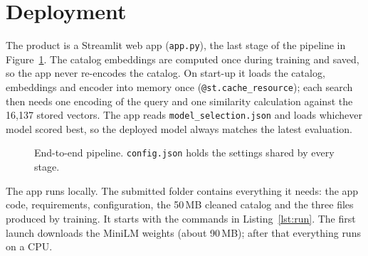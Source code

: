 \section{Deployment}

The product is a Streamlit \cite{streamlit} web app (\texttt{app.py}), the last stage of the pipeline in
Figure~\ref{fig:pipeline}. The catalog embeddings are computed once during training and saved, so the app
never re-encodes the catalog. On start-up it loads the catalog, embeddings and encoder into memory once
(\texttt{@st.cache\_resource}); each search then needs one encoding of the query and one similarity
calculation against the 16,137 stored vectors. The app reads \texttt{model\_selection.json} and loads
whichever model scored best, so the deployed model always matches the latest evaluation.

\begin{figure}[H]
\centering
{}
\caption{End-to-end pipeline. \texttt{config.json} holds the settings shared by every stage.}
\label{fig:pipeline}
\end{figure}

The app runs locally. The submitted folder contains everything it needs: the app code, requirements,
configuration, the 50\,MB cleaned catalog and the three files produced by training. It starts with the commands in Listing~\ref{lst:run}.
The first launch downloads the MiniLM weights (about 90\,MB); after that everything runs on a CPU.


